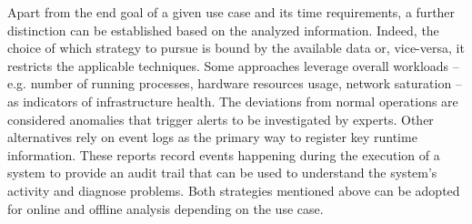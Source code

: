 Apart from the end goal of a given use case and its time requirements, a further distinction can be established based on the analyzed information.
Indeed, the choice of which strategy to pursue is bound by the available data or, vice-versa, it restricts the applicable techniques.
Some approaches leverage overall workloads -- e.g. number of running processes, hardware resources usage, network saturation -- as indicators of infrastructure health. The deviations from normal operations are considered anomalies that trigger alerts to be investigated by experts.
Other alternatives rely on event logs as the primary way to register key runtime information. These reports record events happening during the execution of a system to provide an audit trail that can be used to understand the system's activity and diagnose problems.
Both strategies mentioned above can be adopted for online and offline analysis depending on the use case.